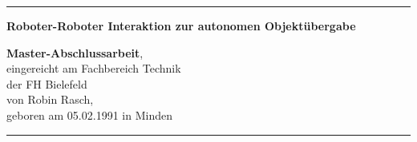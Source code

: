 \begin{titlepage}
\thispagestyle{empty}
    \hrule
    \vspace{1cm}
    \begin{center}
      
        {\huge\bf\sc Roboter-Roboter Interaktion zur autonomen Objektübergabe}
    \end{center}
    \vfill
    \begin{Large}
        {\bf Master-Abschlussarbeit},\\[48pt]
        eingereicht am Fachbereich Technik\\
        der FH Bielefeld\\[72pt]
        von Robin Rasch,\\
        geboren am 05.02.1991 in Minden
        \vfill
        \noindent{\today}
    \end{Large}
    \vspace{1cm}
    \hrule
\end{titlepage}


